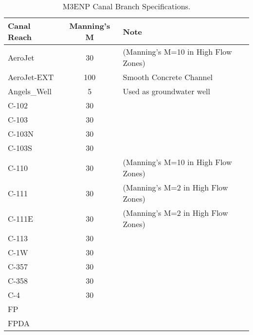 \begin{table}[!h]
\caption{M3ENP Canal Branch Specifications.}
\label{tab:canals}
\begin{tabular}{lcl}
\hline
Canal Reach        & Manning's M  & Note                                        \\
\hline
AeroJet            & 30           & (Manning's M=10 in High Flow Zones)         \\
AeroJet-EXT        & 100          & Smooth Concrete Channel                     \\ %
Angels\_Well       & 5            & Used as groundwater well                    \\
C-102              & 30           &                                             \\
C-103              & 30           &                                             \\
C-103N             & 30           &                                             \\
C-103S             & 30           &                                             \\
C-110              & 30           & (Manning's M=10 in High Flow Zones)         \\
C-111              & 30           & (Manning's M=2  in High Flow Zones)         \\
C-111E             & 30           & (Manning's M=2  in High Flow Zones)         \\
C-113              & 30           &                                             \\
C-1W               & 30           &                                             \\
C-357              & 30           &                                             \\
C-358              & 30           &                                             \\
C-4                & 30           &                                             \\
FP                 &              &                                             \\
FPDA               &              &                                             \\

\end{tabular}
\end{table}
